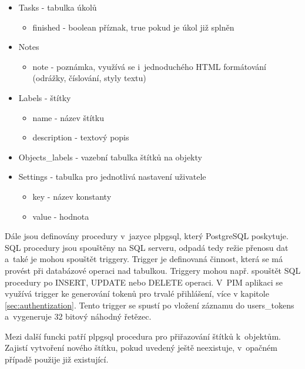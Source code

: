 \documentclass[bc,male,html,dept460]{diploma}				%
\begin{document}
\begin{itemize}
  \item Tasks - tabulka úkolů
      \begin{itemize}
	\item finished - boolean příznak, true pokud je úkol již splněn
      \end{itemize}
  \item Notes
      \begin{itemize}
	\item note - poznámka, využívá se i~jednoduchého HTML formátování (odrážky, číslování, styly textu)
      \end{itemize}
  \item Labels - štítky
      \begin{itemize}
	\item name - název štítku
	\item description - textový popis
      \end{itemize}
  \item Objects\_labels - vazební tabulka štítků na objekty
  \item Settings - tabulka pro jednotlivá nastavení uživatele
      \begin{itemize}
	\item key - název konstanty
	\item value - hodnota
      \end{itemize}
\end{itemize}

Dále jsou definovány procedury v~jazyce plpgsql, který PostgreSQL poskytuje. SQL procedury jsou spouštěny na SQL serveru, odpadá tedy režie přenosu dat a~také je mohou spouštět triggery. Trigger je definovaná činnost, která se má provést při databázové operaci nad tabulkou. Triggery mohou např. spouštět SQL procedury po INSERT, UPDATE nebo DELETE operaci.
V~PIM aplikaci se využívá trigger ke generování tokenů pro trvalé přihlášení, více v kapitole \ref{sec:authentization}. 
Tento trigger se spustí po vložení záznamu do users\_tokens a~vygeneruje 32 bitový náhodný řetězec.

Mezi další funcki patří plpgsql procedura pro přiřazování štítků k~objektům. Zajistí vytvoření nového štítku, pokud uvedený ještě neexistuje, v~opačném případě použije již existující.
\end{document}
